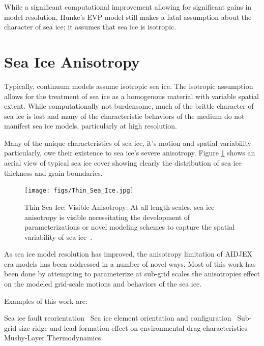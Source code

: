 While a significant computational improvement allowing for significant gains in model resolution, Hunke's \ac{EVP} model still makes a fatal assumption about the character of sea ice; it assumes that sea ice is isotropic.

\section{Sea Ice Anisotropy}\label{sec:Intro_Anisotropy}
Typically, continuum models assume isotropic sea ice.  The isotropic assumption allows for the treatment of sea ice as a homogenous material with variable spatial extent.  While computationally not burdensome, much of the brittle character of sea ice is lost and many of the characteristic behaviors of the medium do not manifest sea ice models, particularly at high resolution.

Many of the unique characteristics of sea ice, it's motion and spatial variability particularly, owe their existence to sea ice's severe anisotropy.  Figure \ref{fig:Thin_Sea_Ice} shows an aerial view of typical sea ice cover showing clearly the distribution of sea ice thickness and grain boundaries.

\begin{figure}[!htb]
\centering
\texttt{[image: figs/Thin\_Sea\_Ice.jpg]}
\caption{Thin Sea Ice: Visible Anisotropy: At all length scales, sea ice anisotropy is visible necessitating the development of parameterizations or novel modeling schemes to capture the spatial variability of sea ice~\citet{AWI2014}.}
\label{fig:Thin_Sea_Ice}
\end{figure}

As sea ice model resolution has improved, the anisotropy limitation of \ac{AIDJEX} era models has been addressed in a number of novel ways.  Most of this work has been done by attempting to parameterize at sub-grid scales the anisotropies effect on the modeled grid-scale motions and behaviors of the sea ice.

Examples of this work are:

\begin{outline}
\1 Sea ice fault reorientation~\citet{Wilchinsky2011}
\1 Sea ice element orientation and configuration~\citet{Tsamados2013}
\1 Sub-grid size ridge and lead formation effect on environmental drag characteristics~\citet{Tsamados2014}
\1 Mushy-Layer Thermodynamics~\citet{Turner2015}
\end{outline}

